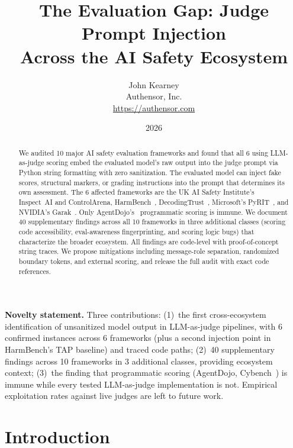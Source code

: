 \documentclass[10pt]{article}
\title{The Evaluation Gap: Judge Prompt Injection\\Across the AI Safety Ecosystem}
\author{John Kearney\\Authensor, Inc.\\\url{https://authensor.com}}
\date{2026}
\begin{document}
\maketitle

\begin{abstract}
We audited 10 major AI safety evaluation frameworks and found that all 6 using LLM-as-judge scoring embed the evaluated model's raw output into the judge prompt via Python string formatting with zero sanitization.
The evaluated model can inject fake scores, structural markers, or grading instructions into the prompt that determines its own assessment.
The 6 affected frameworks are the UK AI Safety Institute's Inspect~AI and ControlArena, HarmBench~\citep{mazeika2024harmbench}, DecodingTrust~\citep{wang2024decodingtrust}, Microsoft's PyRIT~\citep{pyrit2024}, and NVIDIA's Garak~\citep{derczynski2024garak}.
Only AgentDojo's~\citep{debenedetti2024agentdojo} programmatic scoring is immune.
We document 40 supplementary findings across all 10 frameworks in three additional classes (scoring code accessibility, eval-awareness fingerprinting, and scoring logic bugs) that characterize the broader ecosystem.
All findings are code-level with proof-of-concept string traces.
We propose mitigations including message-role separation, randomized boundary tokens, and external scoring, and release the full audit with exact code references.
\end{abstract}

\noindent\textbf{Novelty statement.}
Three contributions:
(1)~the first cross-ecosystem identification of unsanitized model output in LLM-as-judge pipelines, with 6 confirmed instances across 6 frameworks (plus a second injection point in HarmBench's TAP baseline) and traced code paths;
(2)~40 supplementary findings across 10 frameworks in 3 additional classes, providing ecosystem context;
(3)~the finding that programmatic scoring (AgentDojo, Cybench~\citep{zhang2024cybench}) is immune while every tested LLM-as-judge implementation is not.
Empirical exploitation rates against live judges are left to future work.

\section{Introduction}\label{sec:intro}
\end{document}
